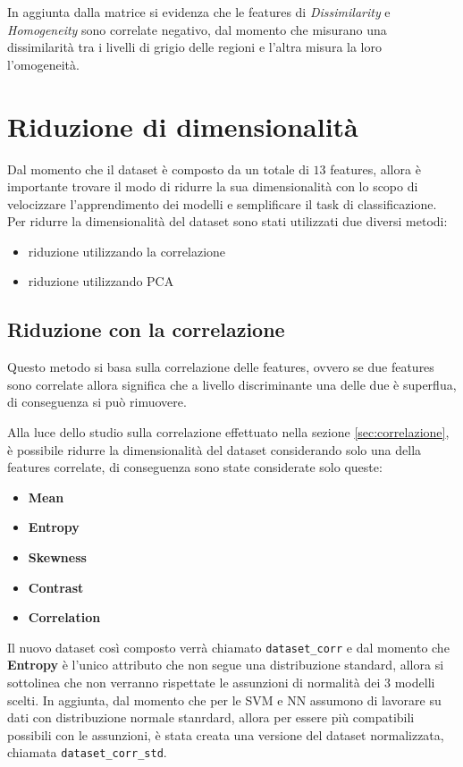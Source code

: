 In aggiunta dalla matrice si evidenza che le features di \textit{Dissimilarity}
e \textit{Homogeneity} sono correlate negativo, dal momento che misurano una dissimilarità
tra i livelli di grigio delle regioni e l'altra misura la loro l'omogeneità. 

\section{Riduzione di dimensionalità} \label{sec:riduzone_di_dimensionalità}
Dal momento che il dataset è composto da un totale di $13$ features, allora 
è importante trovare il modo di ridurre la sua dimensionalità con lo scopo di
velocizzare l'apprendimento dei modelli e semplificare il task di classificazione.
Per ridurre la dimensionalità del dataset sono stati utilizzati due diversi metodi:
\begin{itemize}
      \item riduzione utilizzando la correlazione
      \item riduzione utilizzando PCA
\end{itemize}

\subsection{Riduzione con la correlazione} \label{sec:riduzione_correlazione}
Questo metodo si basa sulla correlazione delle features, ovvero se due features 
sono correlate allora significa che a livello discriminante una delle due è superflua,
di conseguenza si può rimuovere.

Alla luce dello studio sulla correlazione effettuato nella sezione \ref{sec:correlazione},
è possibile ridurre la dimensionalità del dataset considerando solo una della 
features correlate, di conseguenza sono state considerate solo queste:
\begin{itemize}
      \item \textbf{Mean}
      \item \textbf{Entropy}
      \item \textbf{Skewness}
      \item \textbf{Contrast}
      \item \textbf{Correlation}
\end{itemize}

Il nuovo dataset così composto verrà chiamato \texttt{dataset\_corr} e dal momento
che \textbf{Entropy} è l'unico attributo che non segue una distribuzione standard,
allora si sottolinea che non verranno rispettate le assunzioni di normalità dei 
$3$ modelli scelti. In aggiunta, dal momento che per le SVM e NN assumono di 
lavorare su dati con distribuzione normale stanrdard, allora per essere più 
compatibili possibili con le assunzioni, è stata creata una versione del dataset
normalizzata, chiamata  \texttt{dataset\_corr\_std}. 

